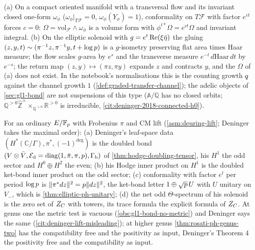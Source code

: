 \begin{proposition}[Compact manifolds force $c = 0$; what the solenoid changes]
\label{prop:deninger-alpha-zero-solenoid}
(a) On a compact oriented manifold with a transversal flow and its invariant closed one-form $\omega_\phi$
($\omega_\phi|_{T\mathcal F} = 0$, $\omega_\phi(Y_\phi) = 1$), conformality on $T\mathcal F$ with factor $e^{ct}$ forces $c = 0$:
$\Omega = \mathrm{vol}_{\mathcal F}\wedge\omega_\phi$ is a volume form with $\phi^{t*}\Omega = e^{ct}\Omega$ and invariant integral. %
(b) On the elliptic solenoid with $g = e^t\operatorname{Re}(\xi\bar\eta)$ the gluing $(z,y,t)\sim(\pi^{-1}z,\pi^{-1}y,t+\log p)$ is a %
$g$-isometry preserving flat area times Haar measure; the flow scales $g$-area by $e^s$ and the transverse measure
$e^{-t}\,d\mathrm{Haar}\,dt$ by $e^{-s}$; the return map $(z,y)\mapsto(\pi z,\pi y)$ expands $z$ and contracts $y$, and
the $\Omega$ of (a) does not exist. In the notebook's normalisations this is the counting growth $q$ against the %
channel growth $1$ (\cref{def:graded-transfer-channel}); the adelic objects of \cref{sec:gl1-bond} are not
suspensions of this type ($\mathbb A/\mathbb Q$ has no closed orbits; $\mathbb Q^{>0}\hat{\mathbb Z}^\times\times_{\mathbb Q^{>0}}\mathbb R^{>0}$
is irreducible, \cref{cit:deninger-2018-connected-h0}).
\end{proposition}

\begin{proposition}
\label{prop:deninger-elliptic-hodge-ket}
For an ordinary $E/\mathbb F_p$ with Frobenius $\pi$ and CM lift (\cref{asm:deuring-lift}; Deninger takes the maximal order):
(a) Deninger's leaf-space data $(H^*(\mathbb C/\Gamma),\pi^*,(-1)^{\deg})$ is the doubled bond
$(V\otimes\bar V,\mathcal E_{\mathrm d} = \operatorname{diag}(1,\bar\pi,\pi,p),\Gamma_{\mathrm b})$ of \cref{thm:hodge-doubling-tensor}, his $H^1$ the odd sector
and $H^0\oplus H^2$ the even; (b) his Hodge inner product on $H^1$ is the doubled ket-bond inner product on the odd
sector; (c) conformality with factor $e^t$ per period $\log p$ is $\|\pi^*dz\|^2 = p\|dz\|^2$, the ket-bond letter
$1\oplus\sqrt{p}\,U$ with $U$ unitary on $V_-$, which is \cref{thm:elliptic-ph-unitary}; (d) the net odd
$\Theta$-spectrum of his solenoid is the zero set of $Z_C$ with towers, its trace formula the explicit formula of
$Z_C$. At genus one the metric test is vacuous (\cref{obs:gl1-bond-no-metric}) and Deninger says the same
(\cref{cit:deninger-lift-misleading}); at higher genus \cref{thm:rosati-ph-genus-two} has the compatibility free and
the positivity as input, Deninger's Theorem 4 the positivity free and the compatibility as input.
\end{proposition}

